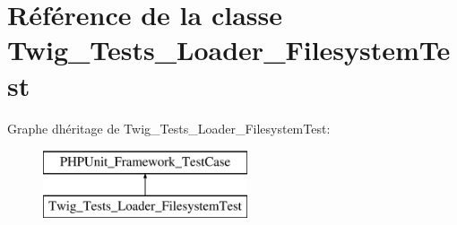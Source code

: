 \hypertarget{class_twig___tests___loader___filesystem_test}{}\section{Référence de la classe Twig\+\_\+\+Tests\+\_\+\+Loader\+\_\+\+Filesystem\+Test}
\label{class_twig___tests___loader___filesystem_test}
Graphe d\textquotesingle{}héritage de Twig\+\_\+\+Tests\+\_\+\+Loader\+\_\+\+Filesystem\+Test\+:\begin{figure}[H]
\begin{center}
\leavevmode
\includegraphics[height=2.000000cm]{class_twig___tests___loader___filesystem_test}
\end{center}
\end{figure}
